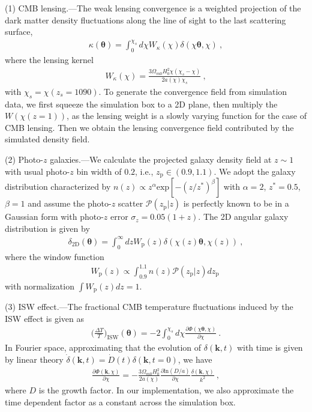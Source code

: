 \documentclass[aps,prl,twocolumn,showpacs,superscriptaddress,groupedaddress,nofootinbib,floatfix]{revtex4}  %
\newcommand{\mr}{\mathrm}
\begin{document}

(1) CMB lensing.---The weak lensing convergence is a weighted projection
of the dark matter density fluctuations along the line of sight to the last 
scattering surface,
\begin{eqnarray}
\kappa(\bm{\theta})=\int_0^{\chi_s}d\chi 
W_\kappa(\chi)\delta(\chi\bm{\theta},\chi)\ ,
\end{eqnarray}
where the lensing kernel
\begin{eqnarray}
W_\kappa(\chi)=\frac{3\Omega_{m0}H_0^2\chi(\chi_s-\chi)}{2a(\chi)\chi_s}\ ,
\end{eqnarray}
with $\chi_s=\chi(z_s=1090)$.
To generate the convergence field from simulation data, we first squeeze the 
simulation box to a 2D plane, then multiply the $W(\chi(z=1))$, as the 
lensing weight is a slowly varying function for the case of CMB lensing.
Then we obtain the lensing convergence field contributed by the simulated 
density field.

(2) Photo-$z$ galaxies.---We calculate the projected galaxy density field at 
$z\sim 1$ with usual photo-$z$ bin width of $0.2$, i.e., $z_\mr{p}\in(0.9,1.1)$.
We adopt the galaxy distribution characterized by 
$n(z)\propto z^{\alpha}\mr{exp}[-(z/z^{*})^\beta]$
with $\alpha=2$, $z^*=0.5$, $\beta=1$
and assume the photo-$z$ scatter $\mathcal{P}(z_\mr{p}|z)$ is perfectly known to be in a Gaussian form with photo-$z$ error $\sigma_z=0.05(1+z)$.
The 2D angular galaxy distribution is given by
\begin{eqnarray}
\delta_\mr{2D}(\bm{\theta})=\int_0^\infty dzW_\mr{p}(z)
\delta(\chi(z)\bm{\theta},\chi(z))\ ,
\end{eqnarray}
where the window function 
\begin{eqnarray}
W_\mr{p}(z)\propto\int_{0.9}^{1.1} n(z) \mathcal{P}(z_\mr{p}|z) dz_\mr{p}\ 
\end{eqnarray}
with normalization $\int W_\mr{p}(z)dz=1$.

(3) ISW effect.---The fractional CMB temperature fluctuations induced by the 
ISW effect is given as 
\begin{eqnarray}
\bigg(\frac{\Delta T}{T}\bigg)_\mr{ISW}(\bm\theta)=-2\int_0^{\chi_s}d\chi
\frac{\partial\Phi(\chi\bm{\theta},\chi)}{\partial\chi}\ .
\end{eqnarray}
In Fourier space, approximating that the evolution of $\delta(\bm{k},t)$ with 
time is given by linear theory
$\dot\delta(\bm{k},t)=\dot D(t)\delta(\bm{k},t=0)$, we have
\begin{eqnarray}
\frac{\partial\Phi(\bm{k},\chi)}{\partial\chi}=-\frac{3\Omega_{m0}H_0^2}
{2a(\chi)}\frac{\partial\mr{ln}(D/a)}{\partial\chi}
\frac{\delta(\bm{k},\chi)}{k^2}\ ,
\end{eqnarray}
where $D$ is the growth factor.
In our implementation, we also approximate the time dependent factor as a 
constant across the simulation box.
\end{document}

